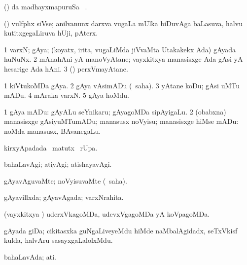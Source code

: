 {{{{{{\begin{center}
{\bentry
{} 
\gl{\kirx}
\expl{}
\bmng
(\pArxparx)  \kirx da madhayxmapuruSa \Eva\ \BU. 
\emng
\eentry

\bentry
{} 
\gl{\nA}
\expl{}
\bmng
(\ravi) vulfphx siVse; anilvanunx darxva \mo vugaLa mUlka biDuvAga baLasuva, halvu kutitxgegaLiruva hUji, pAterx. 
\emng
\eentry

\bentry
{} 
\gl{\nA}
\expl{}
\bmng
\bnum
\num{1} varxN; gAya; (koyatx, irita, \mo vugaLiMda jiVvaMta Utakakekx Ada) gAyada huNuNx. 
\num{2} mAnahAni yA manoVyAtane; vayxkitxya manasisxge Ada gAsi yA hesarige Ada hAni. 
\num{3} (\kAparx) perxVmayAtane. 
\enum
\emng

\noindent
\gl{\pagu}
\expl{}
\bmng
\bnum
\num{1}  kiVtukoMDa gAya. 
\num{2}  gAya vAsimADu (\rUpa\ saha). 
\num{3}  yAtane koDu; gAsi uMTu mADu. 
\num{4}  mAraka varxN. 
\num{5}  gAya hoMdu. 
\enum
\emng
\eentry

\bentry
{} 
\gl{\sakirx}
\expl{}
\bmng
\bnum
\num{1} gAya mADu:  gAyALu seYnikaru; gAyagoMDa sipAyigaLu. 
\num{2} (obabxna) manasisxge gAsiyuMTumADu; manasusx noVyisu; manasisxge hiMse mADu:  noMda manasusx, BAvanegaLu. 
\enum
\emng
\eentry

\bentry
{} 
\gl{\kirx}
\expl{}
\bmng
{} kirxyApadada \BU\ matutx \BUkaq\ rUpa. 
\emng
\eentry

\bentry
{} 
\gl{\kirxvi}
\expl{}
\bmng
bahaLavAgi; atiyAgi; atishayavAgi. 
\emng
\eentry

\bentry
{} 
\gl{\kirxvi}
\expl{}
\bmng
gAyavAguvaMte; noVyisuvaMte (\rUpa\ saha). 
\emng
\eentry

\bentry
{} 
\gl{\gu}
\expl{}
\bmng
gAyavillxda; gAyavAgada; varxNrahita. 
\emng
\eentry

\bentry
{} 
\gl{\gu}
\expl{}
\bmng
(vayxkitxya \vi) uderxVkagoMDa, udevxVgagoMDa yA koVpagoMDa. 
\emng
\eentry

\bentry
{} 
\gl{\nA}
\expl{}
\bmng
gAyada giDa; cikitasxka guNgaLiveyeMdu hiMde naMbalAgidadx, seTxVkisf kulda, halvAru sasayxgaLalolxMdu. 
\emng
\eentry

\bentry
{} 
\gl{\gu}
\expl{}
\bmng
bahaLavAda; ati. 
\emng
\eentry

}
\end{center}}}}}}}
